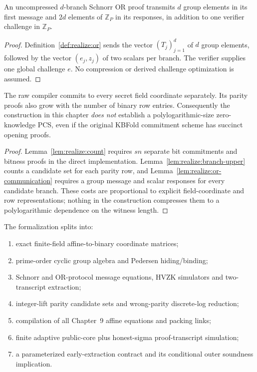 \begin{lemma}\label{lem:realize:or-communication}
An uncompressed $d$-branch
Schnorr OR proof transmits $d$
group elements in its first
message and $2d$ elements of
$\mathbb Z_P$ in its responses,
in addition to one verifier
challenge in $\mathbb Z_P$.
\end{lemma}
\begin{proof}
Definition~\ref{def:realize:or}
sends the vector $(T_j)_{j=1}^d$
of $d$ group elements, followed
by the vector $(e_j,z_j)$ of
two scalars per branch.
The verifier supplies one
global challenge $e$.
No compression or derived
challenge optimization is
assumed.
\end{proof}

\begin{proposition}\label{prop:realize:not-succinct}
The raw compiler commits to every
secret field coordinate separately.
Its parity proofs also grow with
the number of binary row entries.
Consequently the construction
in this chapter \emph{does not}
establish a polylogarithmic-size
zero-knowledge PCS, even if
the original KBFold commitment
scheme has succinct opening proofs.
\end{proposition}
\begin{proof}
Lemma~\ref{lem:realize:count}
requires $sn$ separate bit
commitments and bitness proofs
in the direct implementation.
Lemma~\ref{lem:realize:branch-upper}
counts a candidate set for
each parity row, and
Lemma~\ref{lem:realize:or-communication}
requires a group message
and scalar responses for
every candidate branch.
These costs are proportional
to explicit field-coordinate
and row representations;
nothing in the construction
compresses them to a
polylogarithmic dependence
on the witness length.
\end{proof}

\begin{definition}\label{def:realize:lean-map}
The formalization splits into:
\begin{enumerate}[label=\textup{(\roman*)}]
\item exact finite-field affine-to-binary
coordinate matrices;
\item prime-order cyclic group algebra
and Pedersen hiding/binding;
\item Schnorr and OR-protocol
message equations, HVZK simulators
and two-transcript extraction;
\item integer-lift parity candidate
sets and wrong-parity
discrete-log reduction;
\item compilation of all Chapter~9
affine equations and packing links;
\item finite adaptive public-core plus
honest-sigma proof-transcript simulation;
\item a parameterized early-extraction
contract and its conditional
outer soundness implication.
\end{enumerate}
\end{definition}


